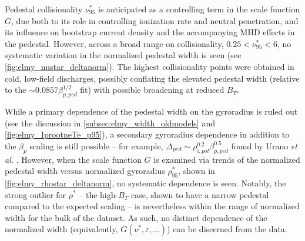 \begin{figure}[t]
 \pushtooutside
\end{figure}

Pedestal collisionality $\nu^*_{95}$ is anticipated as a controlling term in the scale function $G$, due both to its role in controlling ionization rate and neutral penetration, and its influence on bootstrap current density and the accompanying MHD effects in the pedestal.  However, across a broad range on collisionality, $0.25 < \nu^*_{95} < 6$, no systematic variation in the normalized pedestal width is seen (see \cref{fig:elmy_nustar_deltanorm}).  The highest collisionality points were obtained in cold, low-field discharges, possibly conflating the elevated pedestal width (relative to the $\sim 0.0857 \beta_{p,ped}^{1/2}$ fit) with possible broadening at reduced $B_T$.

While a primary dependence of the pedestal width on the gyroradius is ruled out (see the discussion in \cref{subsec:elmy_width_oldmodels} and \cref{fig:elmy_IprootneTe_p95}), a secondary gyroradius dependence in addition to the $\beta_{p}$ scaling is still possible -- for example, $\Delta_{ped} \sim \rho_{i,pol}^{0.2} \beta_{p,ped}^{0.5}$ found by Urano \emph{et al.} \cite{Urano2008}.  However, when the scale function $G$ is examined via trends of the normalized pedestal width versus normalized gyroradius $\rho^*_{95}$, shown in \cref{fig:elmy_rhostar_deltanorm}, no systematic dependence is seen.  Notably, the strong outlier for $\rho^*$ -- the high-$B_T$ case, shown to have a narrow pedestal compared to the expected scaling -- is nevertheless within the range of normalized width for the bulk of the dataset.  As such, no distinct dependence of the normalized width (equivalently, $G(\nu^*,\varepsilon,...)$) can be discerned from the data.\nicesectionending

